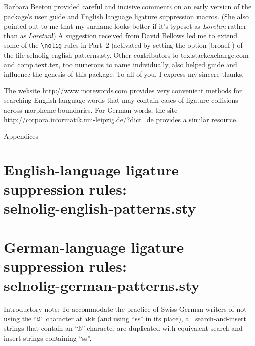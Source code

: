 \documentclass[11pt]{article}
\newcommand{\pkg}[1]{\textsf{#1}}
\newcommand{\cmmd}[1]{\texttt{\textbackslash #1}}
\let\oldappendix\appendix
\renewcommand\appendix{%
   \addtocontents{toc}{\protect{\vspace{1\baselineskip}}}
   \addtocontents{toc}{\protect{\mdseries Appendices\par}}
   \noindent
   {\Large Appendices}
   \oldappendix}
\begin{document}
Barbara Beeton provided careful and incisive comments on an early version of the package's user guide and English language ligature suppression macros. (She also pointed out to me that my surname looks better if it's typeset as \emph{Loretan} rather than as \emph{Lor\mbox{et}an}!) A suggestion received from David Bellows led me to extend some of the \cmmd{nolig} rules in Part~2 (activated by setting the option |broadf|) of the file \pkg{selnolig-english-patterns.sty}. Other contributors to \url{tex.stackexchange.com} and \url{comp.text.tex}, too numerous to name individually, also helped guide and influence the genesis of this package. To all of you, I express my sincere thanks.

The website \url{http://www.morewords.com} provides very convenient methods for searching English language words that may contain cases of ligature collisions across morpheme boundaries. For German words, the site \url{http://corpora.informatik.uni-leipzig.de/?dict=de} provides a similar resource. 



\clearpage
\appendix
\selnoligoff  %


\small %


\section[English-language ligature suppression rules: selnolig-english-patterns.sty]{English-language ligature suppression rules: \\ 
\pkg{selnolig-english-patterns.sty}}
\label{sec:eng-listing}

\begin{multicols}{2}
\end{multicols}

\clearpage
\section[German-language ligature suppression rules:
selnolig-german-patterns.sty]{German-language ligature suppression rules: \\ 
\pkg{selnolig-german-patterns.sty}}
\label{sec:germ-listing}

Introductory note: To accommodate the practice of Swiss-German writers of not using the \enquote{ß} character at akk (and using \enquote{ss} in its place), all search-and-insert strings that contain an \enquote{ß} character are duplicated with equivalent search-and-insert strings containing \enquote{ss}.
\end{document}
